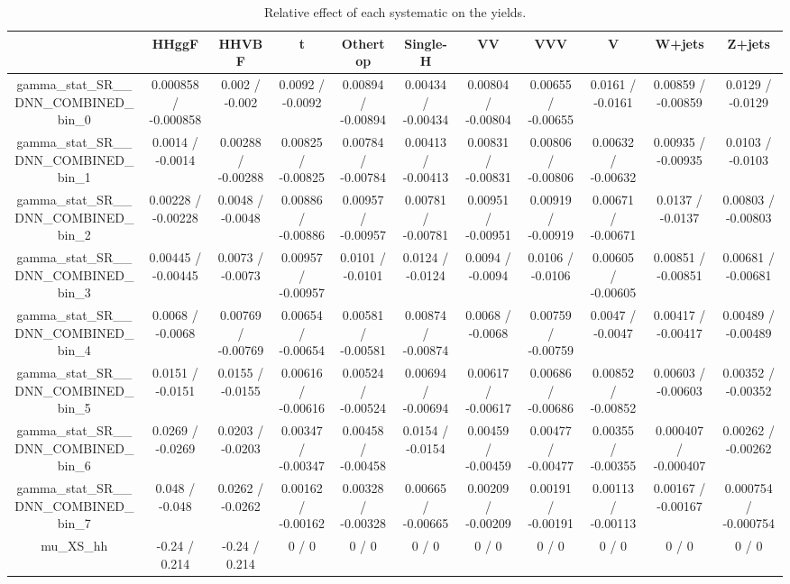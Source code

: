 \documentclass[10pt]{article}
\begin{document}
\begin{table}[htbp]
\begin{center}
\begin{tabular}{|c|c|c|c|c|c|c|c|c|c|c|}
\hline 
      & HHggF      & HHVBF      & t      & Othertop      & Single-H      & VV      & VVV      & V      & W+jets      & Z+jets \\ 
\hline 
  gamma_stat_SR__DNN_COMBINED_bin_0 & 0.000858 / -0.000858 & 0.002 / -0.002 & 0.0092 / -0.0092 & 0.00894 / -0.00894 & 0.00434 / -0.00434 & 0.00804 / -0.00804 & 0.00655 / -0.00655 & 0.0161 / -0.0161 & 0.00859 / -0.00859 & 0.0129 / -0.0129 \\ 
  gamma_stat_SR__DNN_COMBINED_bin_1 & 0.0014 / -0.0014 & 0.00288 / -0.00288 & 0.00825 / -0.00825 & 0.00784 / -0.00784 & 0.00413 / -0.00413 & 0.00831 / -0.00831 & 0.00806 / -0.00806 & 0.00632 / -0.00632 & 0.00935 / -0.00935 & 0.0103 / -0.0103 \\ 
  gamma_stat_SR__DNN_COMBINED_bin_2 & 0.00228 / -0.00228 & 0.0048 / -0.0048 & 0.00886 / -0.00886 & 0.00957 / -0.00957 & 0.00781 / -0.00781 & 0.00951 / -0.00951 & 0.00919 / -0.00919 & 0.00671 / -0.00671 & 0.0137 / -0.0137 & 0.00803 / -0.00803 \\ 
  gamma_stat_SR__DNN_COMBINED_bin_3 & 0.00445 / -0.00445 & 0.0073 / -0.0073 & 0.00957 / -0.00957 & 0.0101 / -0.0101 & 0.0124 / -0.0124 & 0.0094 / -0.0094 & 0.0106 / -0.0106 & 0.00605 / -0.00605 & 0.00851 / -0.00851 & 0.00681 / -0.00681 \\ 
  gamma_stat_SR__DNN_COMBINED_bin_4 & 0.0068 / -0.0068 & 0.00769 / -0.00769 & 0.00654 / -0.00654 & 0.00581 / -0.00581 & 0.00874 / -0.00874 & 0.0068 / -0.0068 & 0.00759 / -0.00759 & 0.0047 / -0.0047 & 0.00417 / -0.00417 & 0.00489 / -0.00489 \\ 
  gamma_stat_SR__DNN_COMBINED_bin_5 & 0.0151 / -0.0151 & 0.0155 / -0.0155 & 0.00616 / -0.00616 & 0.00524 / -0.00524 & 0.00694 / -0.00694 & 0.00617 / -0.00617 & 0.00686 / -0.00686 & 0.00852 / -0.00852 & 0.00603 / -0.00603 & 0.00352 / -0.00352 \\ 
  gamma_stat_SR__DNN_COMBINED_bin_6 & 0.0269 / -0.0269 & 0.0203 / -0.0203 & 0.00347 / -0.00347 & 0.00458 / -0.00458 & 0.0154 / -0.0154 & 0.00459 / -0.00459 & 0.00477 / -0.00477 & 0.00355 / -0.00355 & 0.000407 / -0.000407 & 0.00262 / -0.00262 \\ 
  gamma_stat_SR__DNN_COMBINED_bin_7 & 0.048 / -0.048 & 0.0262 / -0.0262 & 0.00162 / -0.00162 & 0.00328 / -0.00328 & 0.00665 / -0.00665 & 0.00209 / -0.00209 & 0.00191 / -0.00191 & 0.00113 / -0.00113 & 0.00167 / -0.00167 & 0.000754 / -0.000754 \\ 
  mu_XS_hh & -0.24 / 0.214 & -0.24 / 0.214 & 0 / 0 & 0 / 0 & 0 / 0 & 0 / 0 & 0 / 0 & 0 / 0 & 0 / 0 & 0 / 0 \\ 
\hline 
\end{tabular} 
\caption{Relative effect of each systematic on the yields.} 
\end{center} 
\end{table} 
\end{document}
